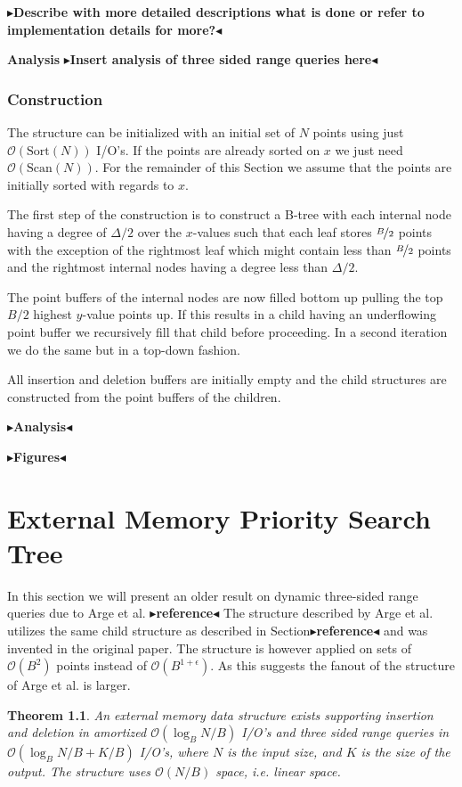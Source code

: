 \documentclass[twoside,11pt,openright]{report}
\newtheorem{theorem}{Theorem}
\newcommand{\todo}[1]{{\color[rgb]{.5,0,0}\textbf{$\blacktriangleright$#1$\blacktriangleleft$}}}
\begin{document}
\todo{Describe with more detailed descriptions what is done or refer to implementation details for more?}

\textbf{Analysis}
\todo{Insert analysis of three sided range queries here}

\subsection{Construction}
The structure can be initialized with an initial set of $N$ points using just $\mathcal{O}(\text{Sort}(N))$ I/O's. If the points are already sorted on $x$ we just need $\mathcal{O}(\text{Scan}(N))$. For the remainder of this Section we assume that the points are initially sorted with regards to $x$.

The first step of the construction is to construct a B-tree with each internal node having a degree of $\Delta/2$ over the $x$-values such that each leaf stores $\nicefrac{B}{2}$ points with the exception of the rightmost leaf which might contain less than $\nicefrac{B}{2}$ points and the rightmost internal nodes having a degree less than $\Delta/2$.

The point buffers of the internal nodes are now filled bottom up pulling the top $B/2$ highest $y$-value points up. If this results in a child having an underflowing point buffer we recursively fill that child before proceeding. In a second iteration we do the same but in a top-down fashion.

All insertion and deletion buffers are initially empty and the child structures are constructed from the point buffers of the children.

\todo{Analysis}

\todo{Figures}


\chapter{External Memory Priority Search Tree}
In this section we will present an older result on dynamic three-sided range queries due to Arge et al. \todo{reference}
The structure described by Arge et al. utilizes the same child structure as described in Section\todo{reference} and was invented in the original paper. The structure is however applied on sets of $\mathcal{O}(B^2)$ points instead of $\mathcal{O}(B^{1+\epsilon})$. As this suggests the fanout of the structure of Arge et al. is larger.

\begin{theorem}
An external memory data structure exists supporting insertion and deletion in amortized $\mathcal{O}(\log_B N/B)$ I/O's and three sided range queries in $\mathcal{O}(\log_B N/B + K/B)$ I/O's, where $N$ is the input size, and $K$ is the size of the output. The structure uses $\mathcal{O}(N/B)$ space, i.e. linear space.
\end{theorem}
\end{document}
